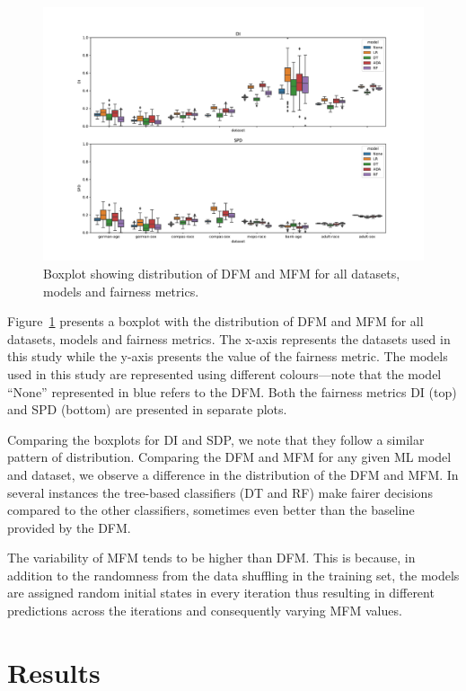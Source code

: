 \documentclass[conference]{IEEEtran}
\begin{document}
\begin{figure}
  \centering
  \includegraphics[width=\linewidth]{boxplot--dataset--di-spd--exp-full.pdf}
  \caption{Boxplot showing distribution of DFM and MFM for all
    datasets, models and fairness metrics.}
  \label{fig:boxplot--dataset--di-spd--exp-full}
\end{figure}

Figure \ref{fig:boxplot--dataset--di-spd--exp-full} presents a boxplot
with the distribution of DFM and MFM for all datasets, models and
fairness metrics. The x-axis represents the datasets used in this
study while the y-axis presents the value of the fairness metric. The
models used in this study are represented using different
colours---note that the model ``None'' represented in blue refers to
the DFM. Both the fairness metrics DI (top) and SPD (bottom) are
presented in separate plots.

Comparing the boxplots for DI and SDP, we note that they follow a
similar pattern of distribution. Comparing the DFM and MFM for any
given ML model and dataset, we observe a difference in the
distribution of the DFM and MFM. In several instances the tree-based
classifiers (DT and RF) make fairer decisions compared to the other
classifiers, sometimes even better than the baseline provided by the
DFM.

The variability of MFM tends to be higher than DFM. This is because,
in addition to the randomness from the data shuffling in the training
set, the models are assigned random initial states in every iteration
thus resulting in different predictions across the iterations and
consequently varying MFM values.

\section{Results}\label{sec:results}
\end{document}
